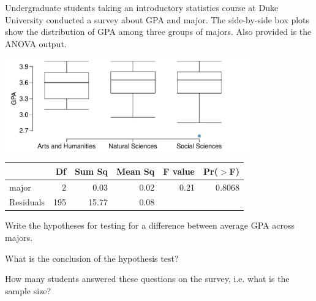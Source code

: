 \begin{problem}
Undergraduate students taking an introductory statistics course at Duke University conducted a survey about GPA and major. The side-by-side box plots show the distribution of GPA among three groups of majors. Also provided is the ANOVA output.

\begin{center}
\includegraphics[width=0.8\textwidth]{./ch_07a_inference_for_means_oi_biostat/figures/eoce/gpa_major/gpa_major}
\end{center}
\begin{center}
\begin{tabular}{lrrrrr}
  \hline
 & Df & Sum Sq & Mean Sq & F value & Pr($>$F) \\ 
  \hline
major & 2 & 0.03 & 0.02 & 0.21 & 0.8068 \\ 
  Residuals & 195 & 15.77 & 0.08 &  &  \\ 
   \hline
\end{tabular}
\end{center}
\begin{parts}
\item Write the hypotheses for testing for a difference between average GPA across majors.
\item What is the conclusion of the hypothesis test?
\item How many students answered these questions on the survey, i.e. what is the sample size?
\end{parts}
\end{problem}


